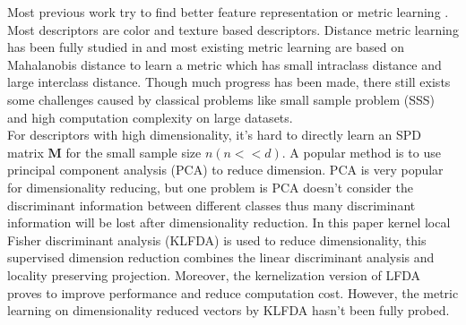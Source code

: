 \documentclass[conference,compsoc]{IEEEtran}
\begin{document}
Most previous work try to find better feature representation \cite{LOMO, GOG, RegionCovariance, SDALF} or metric learning \cite{KISSME, LFDA, PCCA, TDL, PRDC, LMNN, KLFDA, KCCA, KernelVersionMetrics, NFST, ITML}. Most descriptors are color and texture based descriptors. Distance metric learning has been fully studied in \cite{MetricSurvey} and most existing metric learning are based on Mahalanobis distance to learn a metric which has small intraclass distance and large interclass distance. Though much progress has been made, there still exists some challenges caused by classical problems like small sample problem (SSS) and high computation complexity on large datasets. \\
\indent For descriptors with high dimensionality, it's hard to directly learn an SPD matrix $\bm{M}$ for the small sample size $n (n<<d)$. A popular method is to use principal component analysis (PCA) to reduce dimension. PCA is very popular for dimensionality reducing, but one problem is PCA doesn't consider the discriminant information between different classes thus many discriminant information will be lost after dimensionality reduction. In this paper kernel local Fisher discriminant analysis (KLFDA) \cite{KLFDA} is used to reduce dimensionality, this supervised dimension reduction combines the linear discriminant analysis and locality preserving projection. Moreover, the kernelization version of LFDA proves to improve performance and reduce computation cost. However, the metric learning on dimensionality reduced vectors by KLFDA hasn't been fully probed.\\
\end{document}
